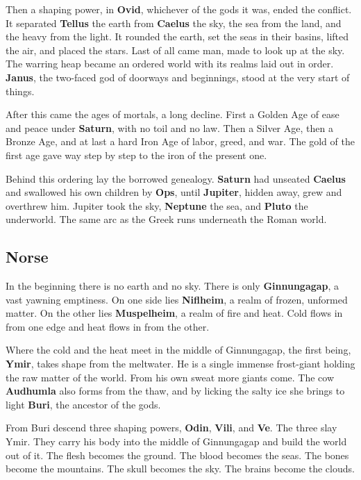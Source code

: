 Then a shaping power, in \textbf{Ovid}, whichever of the gods it was, ended the
conflict. It separated \textbf{Tellus} the earth from \textbf{Caelus} the sky,
the sea from the land, and the heavy from the light. It rounded the earth, set
the seas in their basins, lifted the air, and placed the stars. Last of all came
man, made to look up at the sky. The warring heap became an ordered world with
its realms laid out in order. \textbf{Janus}, the two-faced god of doorways and
beginnings, stood at the very start of things.

After this came the ages of mortals, a long decline. First a Golden Age of ease
and peace under \textbf{Saturn}, with no toil and no law. Then a Silver Age, then
a Bronze Age, and at last a hard Iron Age of labor, greed, and war. The gold of
the first age gave way step by step to the iron of the present one.

Behind this ordering lay the borrowed genealogy. \textbf{Saturn} had unseated
\textbf{Caelus} and swallowed his own children by \textbf{Ops}, until
\textbf{Jupiter}, hidden away, grew and overthrew him. Jupiter took the sky,
\textbf{Neptune} the sea, and \textbf{Pluto} the underworld. The same arc as the
Greek runs underneath the Roman world.

\subsection{Norse}

In the beginning there is no earth and no sky. There is only \textbf{Ginnungagap},
a vast yawning emptiness. On one side lies \textbf{Niflheim}, a realm of frozen,
unformed matter. On the other lies \textbf{Muspelheim}, a realm of fire and heat.
Cold flows in from one edge and heat flows in from the other.

Where the cold and the heat meet in the middle of Ginnungagap, the first being,
\textbf{Ymir}, takes shape from the meltwater. He is a single immense frost-giant
holding the raw matter of the world. From his own sweat more giants come. The cow
\textbf{Audhumla} also forms from the thaw, and by licking the salty ice she
brings to light \textbf{Buri}, the ancestor of the gods.

From Buri descend three shaping powers, \textbf{Odin}, \textbf{Vili}, and
\textbf{Ve}. The three slay Ymir. They carry his body into the middle of
Ginnungagap and build the world out of it. The flesh becomes the ground. The
blood becomes the seas. The bones become the mountains. The skull becomes the
sky. The brains become the clouds.

